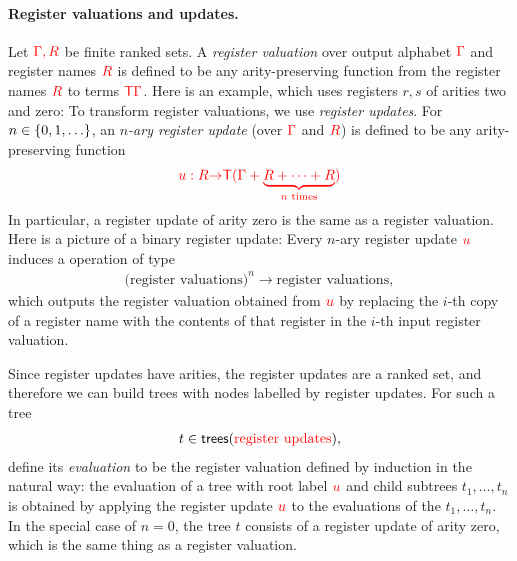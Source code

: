 


\paragraph*{Register valuations and updates.}   Let ${\color{red}{\Gamma, R}}$ be finite ranked sets.
A \emph{register valuation} over output alphabet ${\color{red}{\Gamma}}$ and register names ${\color{red}{R}}$ is defined to be any arity-preserving function from the register names ${{\color{red}{R}}}$ to terms ${\color{red}{\mathsf T}} {\color{red}{\Gamma}}$. Here is an example, which uses registers $r,s$ of arities two and zero:
To transform register valuations, we use \emph{register updates}.  For  $n \in \{0,1,\ldots\}$, an \emph{$n$-ary register update} (over ${\color{red}{\Gamma}}$ and ${\color{red}{R}}$) is defined to be any arity-preserving function
\begin{align}\label{eq:reg-operation}
    {\color{red}{u : {{\color{red}{R}}}{\color{red}{\to}}{\color{red}{\mathsf T}}( {\color{red}{\Gamma}}+ \underbrace{{{{\color{red}{R}}}+ \cdots + {{\color{red}{R}}}}}_{\text{$n$ times}})}}
\end{align}
In particular, a register update of arity zero is the same as a register valuation.
Here is a picture of a binary register update:
Every $n$-ary register update ${\color{red}{u}}$ induces a operation of type 
\begin{align*}
\text{(register valuations)}^n \to \text{register valuations},
\end{align*}
which outputs the register valuation obtained from ${\color{red}{u}}$ by replacing  the $i$-th copy of a register name with the  contents of that register in the $i$-th input register valuation. 

Since register updates have arities, the register updates are a ranked set, and therefore  we can build trees  with nodes labelled by register updates. For such a  tree 
\begin{align*}
    t \in  \mathsf {trees}({\color{red}{\text{register updates}}}),
\end{align*}
define its \emph{evaluation} to be the register valuation defined by induction in the natural way: the evaluation of a tree with root label ${\color{red}{u}}$ and child subtrees $t_1,\ldots,t_n$ is obtained  by applying the register update ${\color{red}{u}}$ to the evaluations of the $t_1,\ldots, t_n$. In the special case of $n=0$, the tree $t$ consists of a register update of arity zero, which is the same thing as a register valuation. 

